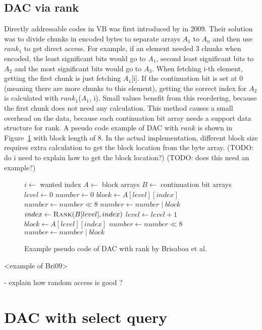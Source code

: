 \section{DAC via rank}
Directly addressable codes in VB was first introduced by \citep{Bri09} in 2009. Their solution was to divide chunks in encoded bytes to separate arrays $A_1$ to 
$A_n$ and then use $rank_1$ to get direct access. For example, if an element needed 3 chunks when encoded, the least significant bits would go to $A_1$, second 
least significant bits to $A_2$ and the most significant bits would go to $A_3$. When fetching i-th element, getting the first chunk is just fetching $A_1$[i]. 
If the continuation bit is set at 0 (meaning there are more chunks to this element), getting the correct index for $A_2$ is calculated with $rank_1$($A_1$, i). 
Small values benefit from this reordering, because the first chunk does not need any calculation. This method causes a small overhead on the data, because each 
continuation bit array needs a support data structure for rank. 
A pseudo code example of DAC with $rank$ is shown in Figure~\ref{bris_pseudo} with block length of 8. In the actual implementation, different block size requires
extra calculation to get the block location from the byte array. (TODO: do i need to explain how to get the block location?) (TODO: does this need an example?)

\begin{figure}[ht]
\begin{algorithmic}
\State $i \gets $ wanted index
\State $A \gets $ block arrays
\State $B \gets $ continuation bit arrays
\State $level \gets 0$
\State $number \gets 0$
\State $block \gets A[level][index]$
\State $number \gets number \mathbin{\ll} 8$
\State $number \gets number \mathbin{|} block$
\State $index \gets \Call{Rank}{B[level], index}$
\State $level \gets level + 1$
\EndWhile
\State $block \gets A[level][index]$
\State $number \gets number \mathbin{\ll} 8$
\State $number \gets number \mathbin{|} block$


\end{algorithmic}
\caption{Example pseudo code of DAC with rank by Brisaboa et al.} \label{bris_pseudo}
\end{figure}
<example of Bri09>

- explain how random access is good ?

\chapter{DAC with select query}

